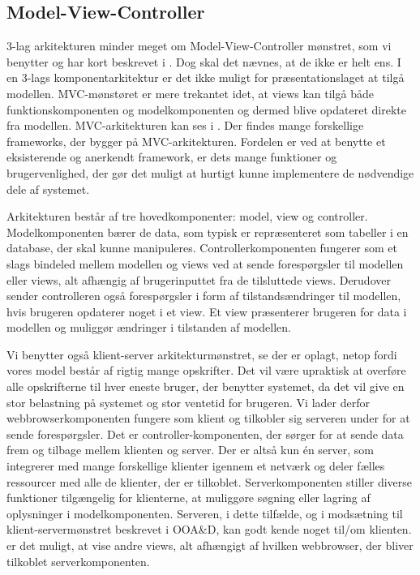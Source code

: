 \subsection{Model-View-Controller}
\label{subsec:mvc}
3-lag arkitekturen minder meget om Model-View-Controller mønstret, som vi benytter og har kort beskrevet i . Dog skal det nævnes, at de ikke er helt ens. I en 3-lags komponentarkitektur er det ikke muligt for præsentationslaget at tilgå modellen. MVC-mønstøret er mere trekantet idet, at views kan tilgå både funktionskomponenten og modelkomponenten og dermed blive opdateret direkte fra modellen\cite{designpatterns}. MVC-arkitekturen kan ses i . Der findes mange forskellige frameworks, der bygger på MVC-arkitekturen. Fordelen er ved at benytte et eksisterende og anerkendt framework, er dets mange funktioner og brugervenlighed, der gør det muligt at hurtigt kunne implementere de nødvendige dele af systemet.

Arkitekturen består af tre hovedkomponenter: model, view og controller. Modelkomponenten bærer de data, som typisk er repræsenteret som tabeller i en database, der skal kunne manipuleres. Controllerkomponenten fungerer som et slags bindeled mellem modellen og views ved at sende forespørgsler til modellen eller views, alt afhængig af brugerinputtet fra de tilsluttede views. Derudover sender controlleren også forespørgsler i form af tilstandsændringer til modellen, hvis brugeren \fx opdaterer noget i et view. Et view præsenterer brugeren for data i modellen og muliggør ændringer i tilstanden af modellen.

Vi benytter også klient-server arkitekturmønstret, se  der er oplagt, netop fordi vores model består af rigtig mange opskrifter. Det vil være upraktisk at overføre alle opskrifterne til hver eneste bruger, der benytter systemet, da det vil give en stor belastning på systemet og stor ventetid for brugeren. Vi lader derfor webbrowserkomponenten fungere som klient og tilkobler sig serveren under for at sende forespørgsler. Det er controller-komponenten, der sørger for at sende data frem og tilbage mellem klienten og server. Der er altså kun én server, som integrerer med mange forskellige klienter igennem et netværk og deler fælles ressourcer med alle de klienter, der er tilkoblet. Serverkomponenten stiller diverse funktioner tilgængelig for klienterne, \fx at muliggøre søgning eller lagring af oplysninger i modelkomponenten. Serveren, i dette tilfælde, og i modsætning til klient-servermønstret beskrevet i OOA\&D\cite{ooad}, kan godt kende noget til/om klienten. \Fx er det muligt, at vise andre views, alt afhængigt af hvilken webbrowser, der bliver tilkoblet serverkomponenten.

